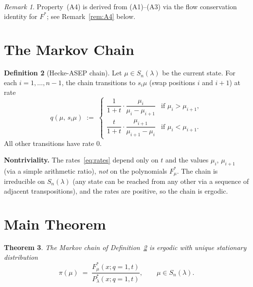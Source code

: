 \documentclass[12pt]{article}
\newtheorem{theorem}{Theorem}
\theoremstyle{definition}
\newtheorem{definition}[theorem]{Definition}
\theoremstyle{remark}
\newtheorem{remark}[theorem]{Remark}
\begin{document}
\begin{remark}
Property~(A4) is derived from (A1)--(A3) via the flow conservation identity for
$F^*$; see Remark~\ref{rem:A4} below.
\end{remark}

\section{The Markov Chain}

\begin{definition}[Hecke-ASEP chain]\label{def:chain}
Let $\mu \in S_n(\lambda)$ be the current state.  For each $i = 1,\dots,n-1$,
the chain transitions to $s_i\mu$ (swap positions $i$ and $i+1$) at rate
\begin{equation}\label{eq:rates}
  q(\mu,\,s_i\mu)
  \;:=\;
  \begin{cases}
    \dfrac{1}{1+t}\cdot\dfrac{\mu_i}{\mu_i - \mu_{i+1}}
    & \text{if } \mu_i > \mu_{i+1},\\[8pt]
    \dfrac{t}{1+t}\cdot\dfrac{\mu_{i+1}}{\mu_{i+1}-\mu_i}
    & \text{if } \mu_i < \mu_{i+1}.
  \end{cases}
\end{equation}
All other transitions have rate 0.
\end{definition}

\noindent\textbf{Nontriviality.}
The rates~\eqref{eq:rates} depend only on $t$ and the values $\mu_i$,
$\mu_{i+1}$ (via a simple arithmetic ratio), \emph{not} on the polynomials
$F^*_\mu$.  The chain is irreducible on $S_n(\lambda)$ (any state can be
reached from any other via a sequence of adjacent transpositions), and the
rates are positive, so the chain is ergodic.

\section{Main Theorem}

\begin{theorem}\label{thm:main}
The Markov chain of Definition~\ref{def:chain} is ergodic with unique
stationary distribution
\[
  \pi(\mu) \;=\; \frac{F^*_\mu(x;q=1,t)}{P^*_\lambda(x;q=1,t)},
  \qquad \mu \in S_n(\lambda).
\]
\end{theorem}
\end{document}
